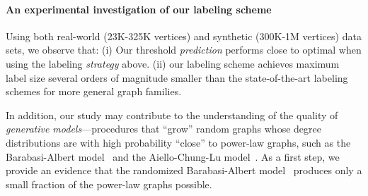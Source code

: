 \paragraph{An experimental investigation  of our labeling scheme}
Using both real-world (23K-325K vertices) and synthetic (300K-1M vertices) data sets, we observe that:
(i) Our threshold \emph{prediction} performs close to optimal when using the labeling \emph{strategy} above. 
(ii) our labeling scheme achieves maximum label size several orders of magnitude smaller than the state-of-the-art labeling schemes for more general graph families.
\vspace{\baselineskip}

In addition, our study  may contribute to  the understanding of the quality of  \emph{generative models}---procedures that ``grow'' random graphs whose degree distributions are with high probability ``close'' to power-law graphs,  such as the Barabasi-Albert model~\cite{barabasi1999emergence} and the   Aiello-Chung-Lu model~\cite{aiello2001random}. As a first step, we provide an evidence  that the randomized Barabasi-Albert model~\cite{barabasi1999emergence} produces only a small fraction of the power-law graphs possible.








